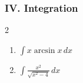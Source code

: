 \documentclass[12pt]{article}
\begin{document}
\subsubsection*{IV. Integration}
\begin{multicols}{2}
\begin{enumerate}
   \item $\displaystyle \int x\arcsin{x} \, dx$
  \item \(\int \frac{x^{2}}{\sqrt{x^{2}-4}}\,dx\)
\end{enumerate}
\end{multicols}

\end{document}
